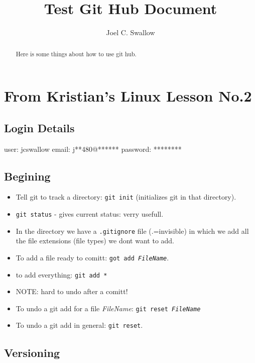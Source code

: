\documentclass[a4paper,10pt]{article}
\title{Test Git Hub Document}
\author{Joel C. Swallow}
\begin{document}
\maketitle

\begin{abstract}
Here is some things about how to use git hub.
\end{abstract}

\section{From Kristian's Linux Lesson No.2}

\subsection{Login Details}
user: jcswallow
email: j**480@******
password: ********

\subsection{Begining}
\begin{itemize}
 \item Tell git to track a directory: \texttt{git init} (initializes git in that directory).
 \item \texttt{git status} - gives current status: verry usefull.
 \item In the directory we have a \texttt{.gitignore} file (.=invisible) in which we add all the file extensions (file types) we dont want to add.
 \item To add a file ready to comitt: \texttt{got add \textit{FileName}}.
 \item to add everything: \texttt{git add *}
 \item NOTE: hard to undo after a comitt!
 \item To undo a git add for a file \textit{FileName}: \texttt{git reset \textit{FileName}}
 \item To undo a git add in general: \texttt{git reset}. 
\end{itemize}

\subsection{Versioning}
\end{document}
